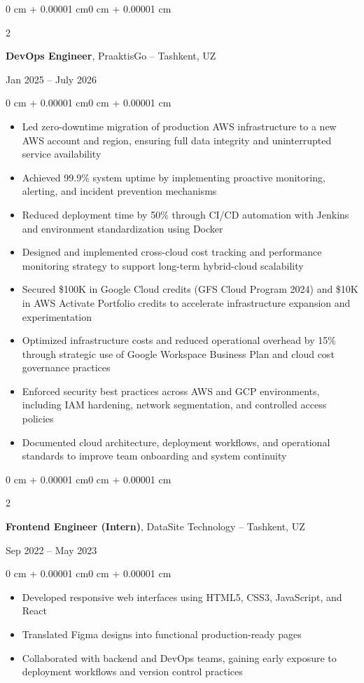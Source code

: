\documentclass[10pt, letterpaper]{article}
\newenvironment{highlights}{
    \begin{itemize}[
        topsep=0.10 cm,
        parsep=0.10 cm,
        partopsep=0pt,
        itemsep=0pt,
        leftmargin=0 cm + 10pt
    ]
}{
    \end{itemize}
}
\newenvironment{onecolentry}{
    \begin{adjustwidth}{0 cm + 0.00001 cm}{0 cm + 0.00001 cm}
}{
    \end{adjustwidth}
}
\newenvironment{twocolentry}[2][]{
    \onecolentry
    \def\secondColumn{#2}
    \setcolumnwidth{\fill, 4.5 cm}
    \begin{paracol}{2}
}{
    \switchcolumn \raggedleft \secondColumn
    \end{paracol}
    \endonecolentry
}
\begin{document}
    \begin{twocolentry}{Jan 2025 -- July 2026}
        \textbf{DevOps Engineer}, PraaktisGo -- Tashkent, UZ
    \end{twocolentry}
    \vspace{0.10 cm}
    \begin{onecolentry}
        \begin{highlights}
        \item Led zero-downtime migration of production AWS infrastructure to a new AWS account and region, ensuring full data integrity and uninterrupted service availability
        \item Achieved 99.9\% system uptime by implementing proactive monitoring, alerting, and incident prevention mechanisms
        \item Reduced deployment time by 50\% through CI/CD automation with Jenkins and environment standardization using Docker
        \item Designed and implemented cross-cloud cost tracking and performance monitoring strategy to support long-term hybrid-cloud scalability
        \item Secured \$100K in Google Cloud credits (GFS Cloud Program 2024) and \$10K in AWS Activate Portfolio credits to accelerate infrastructure expansion and experimentation
        \item Optimized infrastructure costs and reduced operational overhead by 15\% through strategic use of Google Workspace Business Plan and cloud cost governance practices
        \item Enforced security best practices across AWS and GCP environments, including IAM hardening, network segmentation, and controlled access policies
        \item Documented cloud architecture, deployment workflows, and operational standards to improve team onboarding and system continuity
\end{highlights}
\end{onecolentry}
    \vspace{0.20 cm}
    
    \begin{twocolentry}{Sep 2022 -- May 2023}
        \textbf{Frontend Engineer (Intern)}, DataSite Technology -- Tashkent, UZ
    \end{twocolentry}
    \vspace{0.10 cm}
    \begin{onecolentry}
        \begin{highlights}
            \item Developed responsive web interfaces using HTML5, CSS3, JavaScript, and React
            \item Translated Figma designs into functional production-ready pages
            \item Collaborated with backend and DevOps teams, gaining early exposure to deployment workflows and version control practices
        \end{highlights}
    \end{onecolentry}
    \vspace{0.90 cm}
    
\end{document}
